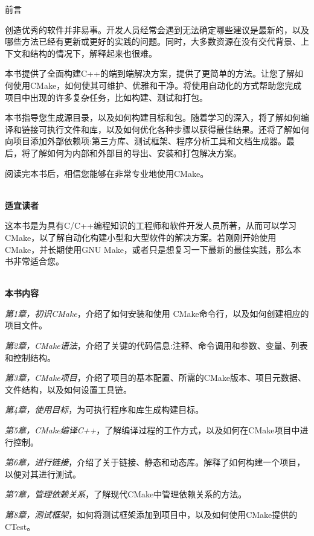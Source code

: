 \begin{flushright}
 前言
\end{flushright}

创造优秀的软件并非易事。开发人员经常会遇到无法确定哪些建议是最新的，以及哪些方法已经有更新或更好的实践的问题。同时，大多数资源在没有交代背景、上下文和结构的情况下，解释起来也很难。

本书提供了全面构建C++的端到端解决方案，提供了更简单的方法。让您了解如何使用CMake，如何使其可维护、优雅和干净。将使用自动化的方式帮助您完成项目中出现的许多复杂任务，比如构建、测试和打包。

本书指导您生成源目录，以及如何构建目标和包。随着学习的深入，将了解如何编译和链接可执行文件和库，以及如何优化各种步骤以获得最佳结果。还将了解如何向项目添加外部依赖项:第三方库、测试框架、程序分析工具和文档生成器。最后，将了解如何为内部和外部目的导出、安装和打包解决方案。

阅读完本书后，相信您能够在非常专业地使用CMake。

\hspace*{\fill} \\ %
\textbf{适宜读者}

这本书是为具有C/C++编程知识的工程师和软件开发人员所著，从而可以学习CMake，以了解自动化构建小型和大型软件的解决方案。若刚刚开始使用CMake，并长期使用GNU Make，或者只是想复习一下最新的最佳实践，那么本书非常适合您。

\hspace*{\fill} \\ %
\textbf{本书内容}

\textit{第1章，初识CMake}，介绍了如何安装和使用 CMake命令行，以及如何创建相应的项目文件。

\textit{第2章，CMake语法}，介绍了关键的代码信息:注释、命令调用和参数、变量、列表和控制结构。

\textit{第3章，CMake项目}，介绍了项目的基本配置、所需的CMake版本、项目元数据、文件结构，以及如何设置工具链。

\textit{第4章，使用目标}，为可执行程序和库生成构建目标。

\textit{第5章，CMake编译C++}，了解编译过程的工作方式，以及如何在CMake项目中进行控制。

\textit{第6章，进行链接}，介绍了关于链接、静态和动态库。解释了如何构建一个项目，以便对其进行测试。

\textit{第7章，管理依赖关系}，了解现代CMake中管理依赖关系的方法。

\textit{第8章，测试框架}，如何将测试框架添加到项目中，以及如何使用CMake提供的CTest。

